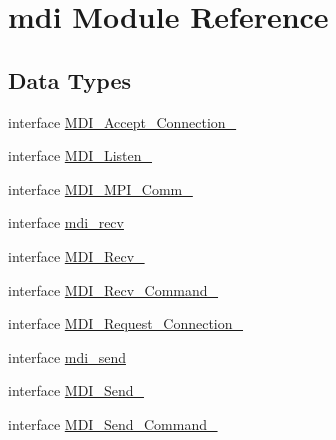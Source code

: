 \hypertarget{classmdi}{\section{mdi Module Reference}
\label{classmdi}
}
\subsection*{Data Types}
\begin{DoxyCompactItemize}
\item 
interface \hyperlink{interfacemdi_1_1MDI__Accept__Connection__}{M\-D\-I\-\_\-\-Accept\-\_\-\-Connection\-\_\-}
\item 
interface \hyperlink{interfacemdi_1_1MDI__Listen__}{M\-D\-I\-\_\-\-Listen\-\_\-}
\item 
interface \hyperlink{interfacemdi_1_1MDI__MPI__Comm__}{M\-D\-I\-\_\-\-M\-P\-I\-\_\-\-Comm\-\_\-}
\item 
interface \hyperlink{interfacemdi_1_1mdi__recv}{mdi\-\_\-recv}
\item 
interface \hyperlink{interfacemdi_1_1MDI__Recv__}{M\-D\-I\-\_\-\-Recv\-\_\-}
\item 
interface \hyperlink{interfacemdi_1_1MDI__Recv__Command__}{M\-D\-I\-\_\-\-Recv\-\_\-\-Command\-\_\-}
\item 
interface \hyperlink{interfacemdi_1_1MDI__Request__Connection__}{M\-D\-I\-\_\-\-Request\-\_\-\-Connection\-\_\-}
\item 
interface \hyperlink{interfacemdi_1_1mdi__send}{mdi\-\_\-send}
\item 
interface \hyperlink{interfacemdi_1_1MDI__Send__}{M\-D\-I\-\_\-\-Send\-\_\-}
\item 
interface \hyperlink{interfacemdi_1_1MDI__Send__Command__}{M\-D\-I\-\_\-\-Send\-\_\-\-Command\-\_\-}
\end{DoxyCompactItemize}
